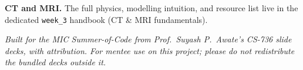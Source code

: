 \documentclass[11pt]{article}
\begin{document}
\textbf{CT and MRI.} The full physics, modelling intuition, and resource list
live in the dedicated \texttt{week\_3} handbook (CT \& MRI fundamentals).

\vfill
\begin{center}\small\itshape
Built for the MIC Summer-of-Code from Prof.\ Suyash P.\ Awate's CS-736 slide
decks, with attribution. For mentee use on this project; please do not
redistribute the bundled decks outside it.
\end{center}
\end{document}
